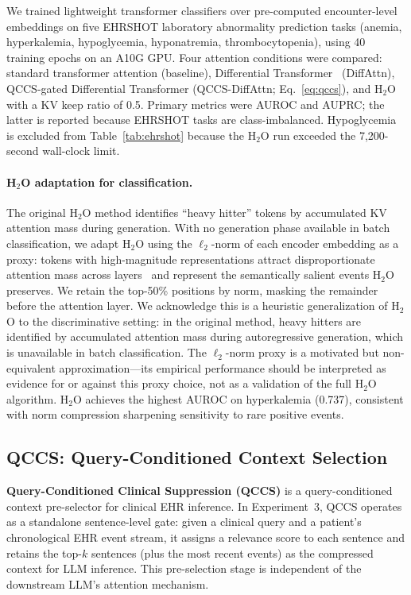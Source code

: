 \documentclass{article}
\begin{document}
We trained lightweight transformer classifiers over pre-computed
encounter-level embeddings on five EHRSHOT laboratory abnormality prediction
tasks (anemia, hyperkalemia, hypoglycemia, hyponatremia, thrombocytopenia),
using 40 training epochs on an A10G GPU. Four attention conditions were
compared: standard transformer attention (baseline), Differential
Transformer~\cite{ye2025differential} (DiffAttn), QCCS-gated Differential
Transformer (QCCS-DiffAttn; Eq.~\ref{eq:qccs}), and H$_2$O~\cite{zhang2023h2o}
with a KV keep ratio of 0.5. Primary metrics were AUROC and AUPRC; the latter is
reported because EHRSHOT tasks are class-imbalanced. Hypoglycemia is excluded
from Table~\ref{tab:ehrshot} because the H$_2$O run exceeded the 7,200-second
wall-clock limit.

\paragraph{H$_2$O adaptation for classification.} The original H$_2$O method
identifies ``heavy hitter'' tokens by accumulated KV attention mass during generation.
With no generation phase available in batch classification, we adapt H$_2$O
using the $\ell_2$-norm of each encoder embedding as a proxy: tokens with
high-magnitude representations attract disproportionate attention mass across
layers~\cite{zhang2023h2o} and represent the semantically salient events H$_2$O
preserves. We retain the top-50\% positions by norm, masking the remainder before
the attention layer. We acknowledge this is a heuristic generalization of H$_2$O
to the discriminative setting: in the original method, heavy hitters are
identified by accumulated attention mass during autoregressive generation, which
is unavailable in batch classification. The $\ell_2$-norm proxy is a motivated
but non-equivalent approximation---its empirical performance should be
interpreted as evidence for or against this proxy choice, not as a validation
of the full H$_2$O algorithm. H$_2$O achieves the highest AUROC on hyperkalemia (0.737),
consistent with norm compression sharpening sensitivity to rare positive events.

\subsection{QCCS: Query-Conditioned Context Selection}
\label{sec:qccs}

\textbf{Query-Conditioned Clinical Suppression (QCCS)} is a query-conditioned
context pre-selector for clinical EHR inference. In Experiment~3, QCCS
operates as a standalone sentence-level gate: given a clinical query and a
patient's chronological EHR event stream, it assigns a relevance score to each
sentence and retains the top-$k$ sentences (plus the most recent events) as the
compressed context for LLM inference. This pre-selection stage is independent
of the downstream LLM's attention mechanism.
\end{document}
